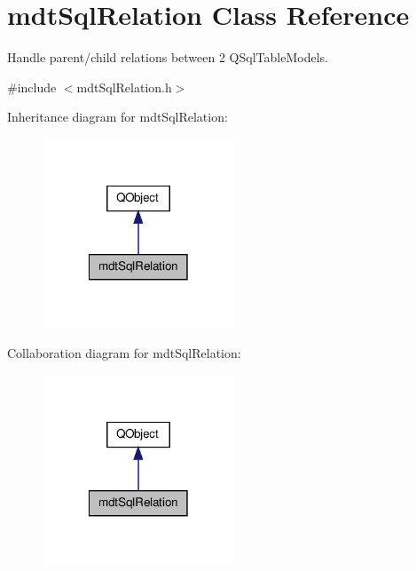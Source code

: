 \hypertarget{classmdt_sql_relation}{\section{mdt\-Sql\-Relation Class Reference}
\label{classmdt_sql_relation}
}


Handle parent/child relations between 2 Q\-Sql\-Table\-Models.  




{\ttfamily \#include $<$mdt\-Sql\-Relation.\-h$>$}



Inheritance diagram for mdt\-Sql\-Relation\-:\nopagebreak
\begin{figure}[H]
\begin{center}
\leavevmode
\includegraphics[width=162pt]{classmdt_sql_relation__inherit__graph}
\end{center}
\end{figure}


Collaboration diagram for mdt\-Sql\-Relation\-:\nopagebreak
\begin{figure}[H]
\begin{center}
\leavevmode
\includegraphics[width=162pt]{classmdt_sql_relation__coll__graph}
\end{center}
\end{figure}

